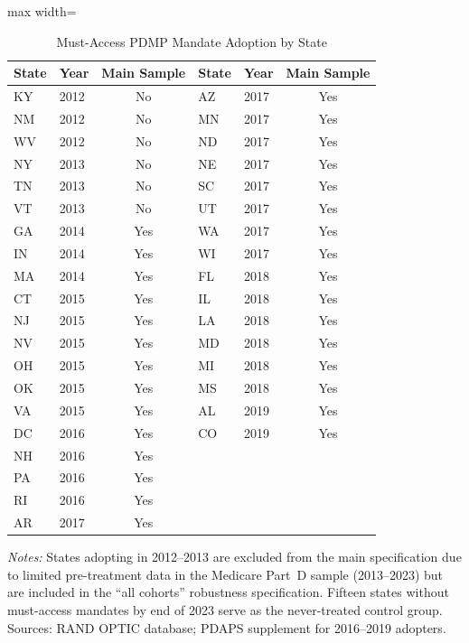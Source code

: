 \documentclass[12pt]{article}
\begin{document}
\begin{table}[htbp]
\centering
\caption{Must-Access PDMP Mandate Adoption by State}
\label{tab:adoption}
\begin{adjustbox}{max width=\textwidth}
\begin{threeparttable}
\begin{tabular}{llcllc}
\toprule
State & Year & Main Sample & State & Year & Main Sample \\
\midrule
KY & 2012 & No & AZ & 2017 & Yes \\
NM & 2012 & No & MN & 2017 & Yes \\
WV & 2012 & No & ND & 2017 & Yes \\
NY & 2013 & No & NE & 2017 & Yes \\
TN & 2013 & No & SC & 2017 & Yes \\
VT & 2013 & No & UT & 2017 & Yes \\
GA & 2014 & Yes & WA & 2017 & Yes \\
IN & 2014 & Yes & WI & 2017 & Yes \\
MA & 2014 & Yes & FL & 2018 & Yes \\
CT & 2015 & Yes & IL & 2018 & Yes \\
NJ & 2015 & Yes & LA & 2018 & Yes \\
NV & 2015 & Yes & MD & 2018 & Yes \\
OH & 2015 & Yes & MI & 2018 & Yes \\
OK & 2015 & Yes & MS & 2018 & Yes \\
VA & 2015 & Yes & AL & 2019 & Yes \\
DC & 2016 & Yes & CO & 2019 & Yes \\
NH & 2016 & Yes &&& \\
PA & 2016 & Yes &&& \\
RI & 2016 & Yes &&& \\
AR & 2017 & Yes &&& \\
\bottomrule
\end{tabular}
\begin{tablenotes}
\footnotesize
\item \textit{Notes:} States adopting in 2012--2013 are excluded from the main specification due to limited pre-treatment data in the Medicare Part~D sample (2013--2023) but are included in the ``all cohorts'' robustness specification. Fifteen states without must-access mandates by end of 2023 serve as the never-treated control group. Sources: RAND OPTIC database; PDAPS supplement for 2016--2019 adopters.
\end{tablenotes}
\end{threeparttable}
\end{adjustbox}
\end{table}
\end{document}
